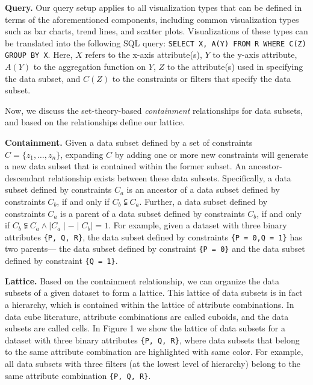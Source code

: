 \textbf{Query.} Our query setup applies to all visualization types that can be defined in terms of the aforementioned components, including common visualization types such as bar charts, trend lines, and scatter plots. Visualizations of these types can be translated into the following \textsc{SQL} query: {\tt SELECT X, A(Y) FROM R WHERE C(Z) GROUP BY X}. Here, $X$ refers to the x-axis attribute(s), $Y$ to the y-axis attribute, $A(Y)$ to the aggregation function on $Y$, $Z$ to the attribute(s) used in specifying the data subset, and $C(Z)$ to the constraints or filters that specify the data subset.

Now, we discuss the set-theory-based \emph{containment} relationships for data subsets, and based on the relationships define our lattice.

\textbf{Containment.} Given a data subset defined by a set of constraints $C = \{z_1, \ldots, z_n\}$, expanding $C$ by adding one or more new constraints will generate a new data subset that is contained within the former subset. An ancestor-descendant relationship exists between these data subsets. Specifically, a data subset defined by constraints $C_a$ is an ancestor of a data subset defined by constraints $C_b$, if and only if $C_b \subsetneqq C_a$. Further, a data subset defined by constraints $C_a$ is a parent of a data subset defined by constraints $C_b$, if and only if $C_b \subsetneqq C_a \land \mid C_a \mid - \mid C_b \mid = 1$. For example, given a dataset with three binary attributes {\tt \{P, Q, R\}}, the data subset defined by constraints {\tt \{P = 0,Q = 1\}} has two parents--- the data subset defined by constraint {\tt \{P = 0\}} and the data subset defined by constraint {\tt \{Q = 1\}}.

\textbf{Lattice.} Based on the containment relationship, we can organize the data subsets of a given dataset to form a lattice. This lattice of data subsets is in fact a hierarchy, which is contained within the lattice of attribute combinations. In data cube literature, attribute combinations are called cuboids, and the data subsets are called cells. In Figure 1 we show the lattice of data subsets for a dataset with three binary attributes {\tt \{P, Q, R\}}, where data subsets that belong to the same attribute combination are highlighted with same color. For example, all data subsets with three filters (at the lowest level of hierarchy) belong to the same attribute combination {\tt \{P, Q, R\}}. 


